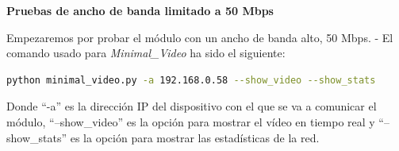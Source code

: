 \newpage

\textbf{Pruebas de ancho de banda limitado a 50 Mbps}
\vspace{\baselineskip}

Empezaremos por probar el módulo con un ancho de banda alto, 50 Mbps.
- El comando usado para \textit{Minimal\_Video} ha sido el siguiente:
\vspace{\baselineskip}

\begin{lstlisting}[language=bash]
python minimal_video.py -a 192.168.0.58 --show_video --show_stats
\end{lstlisting}
Donde ``-a'' es la dirección IP del dispositivo con el que se va a comunicar el módulo, ``--show\_video'' es la opción para mostrar el vídeo en tiempo real y ``--show\_stats'' es la opción para mostrar las estadísticas de la red.
\vspace{\baselineskip}

